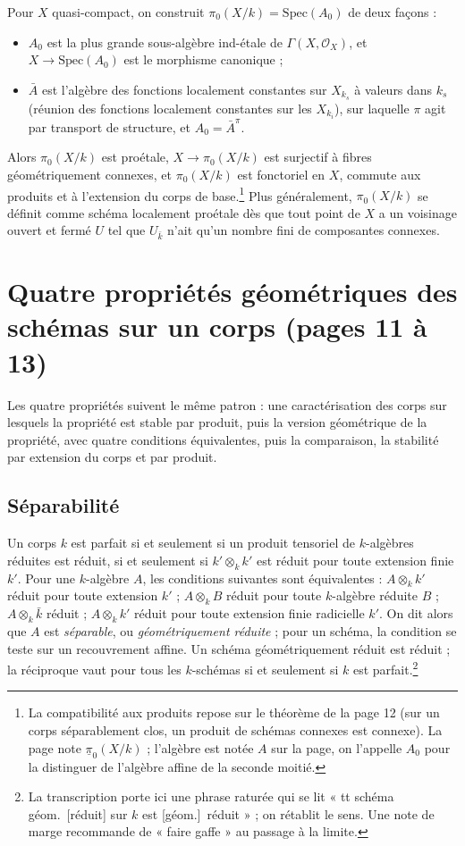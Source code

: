\documentclass[11pt,a4paper]{article}
\begin{document}
Pour $X$ quasi-compact, on construit $\pi_{0}(X/k) = \mathrm{Spec}(A_{0})$ de
deux façons :
\begin{itemize}
\item[a)] $A_{0}$ est la plus grande sous-algèbre ind-étale de
$\Gamma(X, \mathcal{O}_{X})$, et $X \to \mathrm{Spec}(A_{0})$ est le morphisme
canonique ;
\item[b)] $\bar{A}$ est l'algèbre des fonctions localement constantes sur
$X_{k_{s}}$ à valeurs dans $k_{s}$ (réunion des fonctions localement
constantes sur les $X_{k_{i}}$), sur laquelle $\pi$ agit par transport de
structure, et $A_{0} = \bar{A}^{\pi}$.
\end{itemize}
Alors $\pi_{0}(X/k)$ est proétale, $X \to \pi_{0}(X/k)$ est surjectif à
fibres géométriquement connexes, et $\pi_{0}(X/k)$ est fonctoriel en $X$,
commute aux produits et à l'extension du corps de base.\footnote{La
compatibilité aux produits repose sur le théorème de la page 12 (sur un
corps séparablement clos, un produit de schémas connexes est connexe). La
page note $\underline{\pi}_{0}(X/k)$ ; l'algèbre est notée $A$ sur la page,
on l'appelle $A_{0}$ pour la distinguer de l'algèbre affine de la seconde
moitié.}
Plus généralement, $\pi_{0}(X/k)$ se définit comme schéma localement
proétale dès que tout point de $X$ a un voisinage ouvert et fermé $U$ tel
que $U_{\bar k}$ n'ait qu'un nombre fini de composantes connexes.

\section*{Quatre propriétés géométriques des schémas sur un corps (pages 11 à 13)}

Les quatre propriétés suivent le même patron : une caractérisation des corps
sur lesquels la propriété est stable par produit, puis la version
géométrique de la propriété, avec quatre conditions équivalentes, puis la
comparaison, la stabilité par extension du corps et par produit.

\subsection*{Séparabilité}

Un corps $k$ est parfait si et seulement si un produit tensoriel de
$k$-algèbres réduites est réduit, si et seulement si $k' \otimes_{k} k'$ est
réduit pour toute extension finie $k'$. Pour une $k$-algèbre $A$, les
conditions suivantes sont équivalentes : $A \otimes_{k} k'$ réduit pour toute
extension $k'$ ; $A \otimes_{k} B$ réduit pour toute $k$-algèbre réduite $B$ ;
$A \otimes_{k} \bar k$ réduit ; $A \otimes_{k} k'$ réduit pour toute extension
finie radicielle $k'$. On dit alors que $A$ est \emph{séparable}, ou
\emph{géométriquement réduite} ; pour un schéma, la condition se teste sur
un recouvrement affine. Un schéma géométriquement réduit est réduit ; la
réciproque vaut pour tous les $k$-schémas si et seulement si $k$ est
parfait.\footnote{La transcription porte ici une phrase raturée qui se lit
« tt schéma géom.\ [réduit] sur $k$ est [géom.]\ réduit » ; on rétablit le
sens. Une note de marge recommande de « faire gaffe » au passage à la
limite.}
\end{document}
